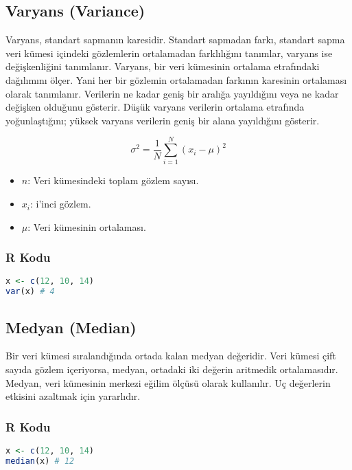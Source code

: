 \newpage

\subsection{Varyans (Variance)}
Varyans, standart sapmanın karesidir. Standart sapmadan farkı, standart sapma veri kümesi içindeki gözlemlerin ortalamadan farklılığını tanımlar, varyans ise değişkenliğini tanımlanır. Varyans, bir veri kümesinin ortalama etrafındaki dağılımını ölçer. Yani her bir gözlemin ortalamadan farkının karesinin ortalaması olarak tanımlanır. Verilerin ne kadar geniş bir aralığa yayıldığını veya ne kadar değişken olduğunu gösterir. Düşük varyans verilerin ortalama etrafında yoğunlaştığını; yüksek varyans verilerin geniş bir alana yayıldığını gösterir. 

\[
\sigma^2 = \frac{1}{N} \sum_{i=1}^{N} (x_i - \mu)^2
\]

\begin{itemize}
    \item $n$: Veri kümesindeki toplam gözlem sayısı.
    \item $x_i$: i'inci gözlem.
    \item $\mu$: Veri kümesinin ortalaması. 
\end{itemize}

\subsubsection{R Kodu}

\begin{lstlisting}[language=R]
x <- c(12, 10, 14)
var(x) # 4
\end{lstlisting}

\newpage

\subsection{Medyan (Median)}
Bir veri kümesi sıralandığında ortada kalan medyan değeridir. Veri kümesi çift sayıda gözlem içeriyorsa, medyan, ortadaki iki değerin aritmedik ortalamasıdır. Medyan, veri kümesinin merkezi eğilim ölçüsü olarak kullanılır. Uç değerlerin etkisini azaltmak için yararlıdır.

\subsubsection{R Kodu}

\begin{lstlisting}[language=R]
x <- c(12, 10, 14)
median(x) # 12
\end{lstlisting}

